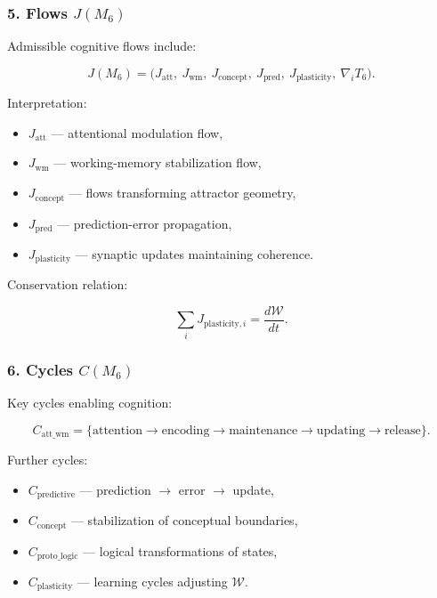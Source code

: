 \subsubsection*{5. Flows \texorpdfstring{$J(M_6)$}{J(M_6)}}

Admissible cognitive flows include:

\[
J(M_6) =
\big(
J_{\mathrm{att}},\
J_{\mathrm{wm}},\
J_{\mathrm{concept}},\
J_{\mathrm{pred}},\
J_{\mathrm{plasticity}},\
\nabla_i T_6
\big).
\]

Interpretation:

\begin{itemize}
    \item $J_{\mathrm{att}}$ — attentional modulation flow,
    \item $J_{\mathrm{wm}}$ — working-memory stabilization flow,
    \item $J_{\mathrm{concept}}$ — flows transforming attractor geometry,
    \item $J_{\mathrm{pred}}$ — prediction-error propagation,
    \item $J_{\mathrm{plasticity}}$ — synaptic updates maintaining coherence.
\end{itemize}

Conservation relation:

\[
\sum_i J_{\mathrm{plasticity},i} = \frac{d\mathcal{W}}{dt}.
\]

\subsubsection*{6. Cycles \texorpdfstring{$C(M_6)$}{C(M_6)}}

Key cycles enabling cognition:

\[
C_{\mathrm{att\_wm}}
=
\{\text{attention} \to \text{encoding} \to
\text{maintenance} \to \text{updating} \to \text{release}\}.
\]

Further cycles:

\begin{itemize}
    \item $C_{\mathrm{predictive}}$ — prediction $\to$ error $\to$ update,
    \item $C_{\mathrm{concept}}$ — stabilization of conceptual boundaries,
    \item $C_{\mathrm{proto\_logic}}$ — logical transformations of states,
    \item $C_{\mathrm{plasticity}}$ — learning cycles adjusting $\mathcal{W}$.
\end{itemize}


